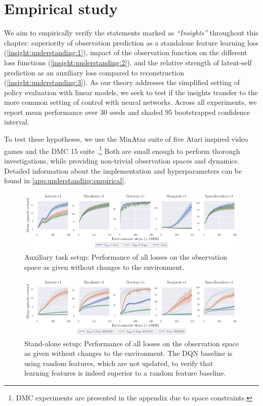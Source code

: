 \section{Empirical study}
\label{sec:understanding:empirical}

We aim to empirically verify the statements marked as \emph{``Insights''} throughout this chapter: superiority of observation prediction as a standalone feature learning loss (\autoref{insight:understanding:1}), impact of the observation function on the different loss functions (\autoref{insight:understanding:2}), and the relative strength of latent-self prediction as an auxiliary loss compared to reconstruction (\autoref{insight:understanding:3}). 
As our theory addresses the simplified setting of policy evaluation with linear models, we seek to test if the insights transfer to the more common setting of control with neural networks.
Across all experiments, we report mean performance over 30 seeds and shaded $95$ bootstrapped confidence interval.

To test these hypotheses, we use the MinAtar suite of five Atari inspired video games \parencite{young19minatar} and the DMC 15 suite  \parencite{tunyasuvunakool2020dmcontrol}.\footnote{DMC experiments are presented in the appendix due to space constraints.}
Both are small enough to perform thorough investigations, while providing non-trivial observation spaces and dynamics.
Detailed information about the implementation and hyperparameters can be found in \autoref{app:understanding:empirical}.


\begin{figure}[b]
    \centering
    \includegraphics[width=\textwidth]{figures/understanding/rlc2024_minatar.pdf}
    \caption{Auxiliary task setup: Performance of all losses on the observation space as given without changes to the environment.}
    \label{fig:understanding:aux}
\end{figure}

\begin{figure}[t]
    \centering
    \includegraphics[width=\textwidth]{figures/understanding/rlc2024-detach_minatar.pdf}
    \caption{Stand-alone setup: Performance of all losses on the observation space as given without changes to the environment. The DQN baseline is using random features, which are not updated, to verify that learning features is indeed superior to a random feature baseline.}
    \label{fig:understanding:sta}
\end{figure}

